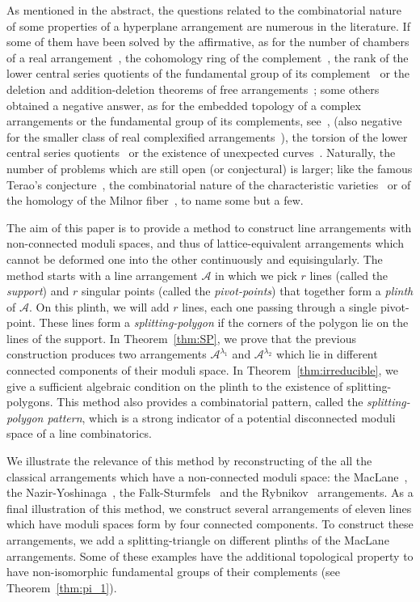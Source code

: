 \documentclass[11pt, a4paper]{amsart}
\theoremstyle{definition}
\theoremstyle{remark}
\newcommand{\A}{\mathcal{A}}
\begin{document}
As mentioned in the abstract, the questions related to the combinatorial nature of some properties of a hyperplane arrangement are numerous in the literature. If some of them have been solved by the affirmative, as for the number of chambers of a real arrangement~\cite{Zas}, the cohomology ring of the complement~\cite{OrlSol}, the rank of the lower central series quotients of the fundamental group of its complement~\cite{Falk:minimal} or the deletion and addition-deletion theorems of free arrangements~\cite{Abe:deletion,Abe:addition-deletion}; some others obtained a negative answer, as for the embedded topology of a complex arrangements or the fundamental group of its complements, see~\cite{Ryb, Gue:ZP, ACGM:arithmetic, Gue:LLN}, (also negative for the smaller class of real complexified arrangements~\cite{ACCM:topology, GueViu:configurations}), the torsion of the lower central series quotients~\cite{ AGV:torsion} or the existence of unexpected curves~\cite{GueViu:configurations}. Naturally, the number of problems which are still open (or conjectural) is larger; like the famous Terao's conjecture~\cite{Ter, OrlTer}, the combinatorial nature of the characteristic varieties~\cite{Lib} or of the homology of the Milnor fiber~\cite[Problem 4.5]{FalkRan:homotopy}, to name some but a few.
	
The aim of this paper is to provide a method to construct line arrangements with non-connected moduli spaces, and thus of lattice-equivalent arrangements which cannot be deformed one into the other continuously and equisingularly. The method starts with a line arrangement $\A$ in which we pick $r$ lines (called the \emph{support}) and $r$ singular points (called the \emph{pivot-points}) that together form a \emph{plinth} of $\A$. On this plinth, we will add $r$ lines, each one passing through a single pivot-point. These lines form a \emph{splitting-polygon} if the corners of the polygon lie on the lines of the support. In Theorem~\ref{thm:SP}, we prove that the previous construction produces two arrangements $\A^{\lambda_1}$ and  $\A^{\lambda_2}$ which lie in different connected components of their moduli space. In  Theorem~\ref{thm:irreducible}, we give a sufficient algebraic condition on the plinth to the existence of splitting-polygons. This method also provides a combinatorial pattern, called the \emph{splitting-polygon pattern}, which is a strong indicator of a potential disconnected moduli space of a line combinatorics.

We illustrate the relevance of this method by reconstructing of the all the classical arrangements which have a non-connected moduli space: the MacLane~\cite{Mac}, the Nazir-Yoshinaga~\cite{NazYos}, the Falk-Sturmfels~\cite{CohSuc:braid} and the Rybnikov~\cite{Ryb} arrangements. As a final illustration of this method, we construct several arrangements of eleven lines which have moduli spaces form by four connected components. To construct these arrangements, we add a splitting-triangle on different plinths of the MacLane arrangements. Some of these examples have the additional topological property to have non-isomorphic fundamental groups of their complements (see Theorem~\ref{thm:pi_1}).
	
\end{document}
